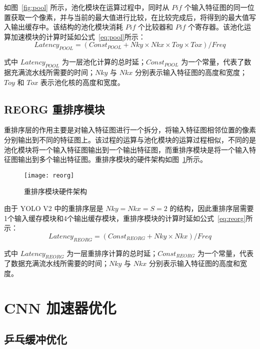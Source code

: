 如图~\ref{fig:pool} 所示，池化模块在运算过程中，同时从 $Pif$ 个输入特征图的同一位置获取一个像素，并与当前的最大值进行比较，在比较完成后，将得到的最大值写入输出缓存中。该结构的池化模块消耗 $Pif$ 个比较器和 $Pif$ 个寄存器。该池化运算加速模块的计算时延如公式~\ref{eq:pool}所示：
\begin{equation} \label{eq:pool}
Latency_{POOL} = (Const_{POOL} + Nky \times Nkx \times Toy \times Tox)/Freq
\end{equation}

式中 $Latency_{POOL}$ 为一层池化计算的总时延；$Const_{POOL}$ 为一个常量，代表了数据充满流水线所需要的时间；$Nky$ 与 $Nkx$ 分别表示输入特征图的高度和宽度；$Toy$ 和 $Tox$ 表示池化核的高度和宽度。 

\subsection{REORG 重排序模块}

重排序层的作用主要是对输入特征图进行一个拆分，将输入特征图相邻位置的像素分别输出到不同的特征图上。该过程的运算与池化模块的运算过程相似，不同的是池化模块将一个输入特征图输出到一个输出特征图，而重排序模块是将一个输入特征图输出到多个输出特征图。重排序模块的硬件架构如图~\ref{fig:reorg}所示。

\begin{figure}[!htbp]
    \centering
    \texttt{[image: reorg]}
    \caption{重排序模块硬件架构}
    \label{fig:reorg}
\end{figure}

由于 YOLO V2 中的重排序层是 $Nky=Nkx=S=2$ 的结构，因此重排序层需要1个输入缓存模块和4个输出缓存模块，重排序模块的计算时延如公式~\ref{eq:reorg}所示：
\begin{equation} \label{eq:reorg}
Latency_{REORG} = (Const_{REORG} + Nky \times Nkx)/Freq
\end{equation}

式中 $Latency_{REORG}$ 为一层重排序计算的总时延；$Const_{REORG}$ 为一个常量，代表了数据充满流水线所需要的时间；$Nky$ 与 $Nkx$ 分别表示输入特征图的高度和宽度。

\section{CNN 加速器优化}

\subsection{乒乓缓冲优化}

